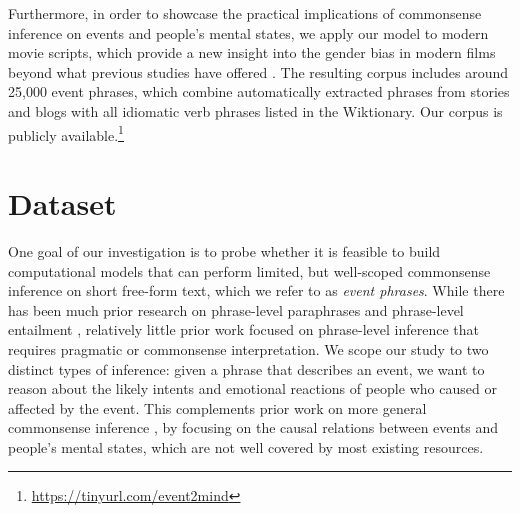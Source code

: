 \documentclass[11pt,a4paper]{article}
\begin{document}
Furthermore, in order to showcase the practical implications of commonsense inference on events and people's mental states, 
we apply our model to modern movie scripts, which provide a new insight into the gender bias in modern films beyond what previous studies have offered \cite{england2011gender,Agarwal2015-lq,Ramakrishna2017,Sap2017-lt}.
The resulting corpus includes around 25,000 event phrases, which combine automatically extracted phrases from stories and blogs with all idiomatic verb phrases listed in the Wiktionary. Our corpus is publicly available.\footnote{\url{https://tinyurl.com/event2mind}}






























 
\section{Dataset}

One goal of our investigation is to probe whether it is feasible to build computational models that can perform limited, but well-scoped commonsense inference on short free-form text, which we refer to as \emph{event phrases}. While there has been much prior research on phrase-level paraphrases \cite{Pavlick2015PPDB2B} and phrase-level entailment \cite{dagan2006pascal}, relatively little prior work focused on phrase-level inference that requires pragmatic or commonsense interpretation. We scope our study to two distinct types of inference: given a phrase that describes an event, we want to reason about the likely intents and emotional reactions of people who caused or affected by the event. This complements prior work on more general commonsense inference \cite{ConceptNet,Li2016CommonsenseKB,Zhang2017OrdinalCI}, by focusing on the causal relations between events and people's mental states, which are not well covered by most existing resources. 
\end{document}
